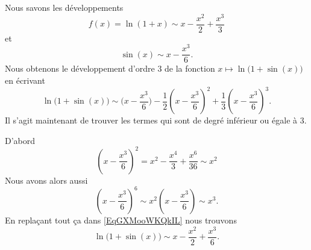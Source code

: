 \begin{example}
    Nous savons les développements
    \begin{equation}
        f(x)=\ln(1+x)\sim x-\frac{ x^2 }{ 2 }+\frac{ x^3 }{ 3 }
    \end{equation}
    et
    \begin{equation}
        \sin(x)\sim x-\frac{ x^3 }{ 6 }.
    \end{equation}
    Nous obtenons le développement d'ordre \( 3\) de la fonction \( x\mapsto \ln\big( 1+\sin(x) \big)\) en écrivant
    \begin{equation}    \label{EqGXMooWKQkIL}
        \ln\big( 1+\sin(x) \big)\sim \big( x-\frac{ x^3 }{ 6 } \big)-\frac{ 1 }{2}\left( x-\frac{ x^3 }{ 6 } \right)^2+\frac{1}{ 3 }\left( x-\frac{ x^3 }{ 6 } \right)^3.
    \end{equation}
    Il s'agit maintenant de trouver les termes qui sont de degré inférieur ou égale à \( 3\).

    D'abord
    \begin{equation}
        \left( x-\frac{ x^3 }{ 6 } \right)^2=x^2-\frac{ x^4 }{ 3 }+\frac{ x^6 }{ 36 }\sim x^2
    \end{equation}
    Nous avons alors aussi
    \begin{equation}
        \left( x-\frac{ x^3 }{ 6 } \right)^6\sim x^2\left( x-\frac{ x^3 }{ 6 } \right)\sim x^3.
    \end{equation}
    En replaçant tout ça dans \eqref{EqGXMooWKQkIL} nous trouvons
    \begin{equation}
        \ln\big( 1+\sin(x) \big)\sim x-\frac{ x^2 }{2}+\frac{ x^3 }{ 6 }.
    \end{equation}
\end{example}


